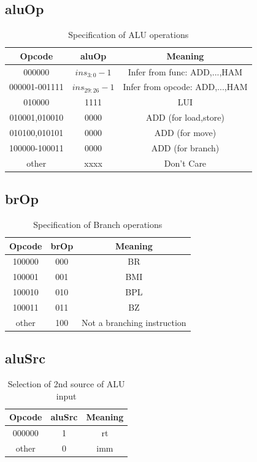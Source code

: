 \documentclass{article}
\begin{document}
\subsection{aluOp}
\begin{table}[H]
    \centering
    \begin{tabular}{|c|c|c|}
        \hline
        \textbf{Opcode} & \textbf{aluOp} & \textbf{Meaning} \\
        \hline
        000000 & $ins_{3:0}-1$ & Infer from func: ADD,...,HAM \\
        000001-001111 & $ins_{29:26}-1$ & Infer from opcode: ADD,...,HAM \\
        010000 & 1111 & LUI \\
        010001,010010 & 0000 & ADD (for load,store)\\
        010100,010101 & 0000 & ADD (for move) \\
        100000-100011 & 0000 & ADD (for branch) \\
        other & xxxx & Don't Care \\
        \hline
    \end{tabular}
    \caption{Specification of ALU operations}
\end{table}

\subsection{brOp}
\begin{table}[H]
    \centering
    \begin{tabular}{|c|c|c|}
        \hline
        \textbf{Opcode} & \textbf{brOp} & \textbf{Meaning} \\
        \hline
        100000 & 000 & BR \\
        100001 & 001 & BMI \\
        100010 & 010 & BPL \\
        100011 & 011 & BZ \\
        other & 100 & Not a branching instruction \\
        \hline
    \end{tabular}
    \caption{Specification of Branch operations}
\end{table}

\subsection{aluSrc}
\begin{table}[H]
    \centering
    \begin{tabular}{|c|c|c|}
        \hline
        \textbf{Opcode} & \textbf{aluSrc} & \textbf{Meaning} \\
        \hline
        000000 & 1 & rt \\
        other & 0 & imm \\
        \hline
    \end{tabular}
    \caption{Selection of 2nd source of ALU input}
\end{table}
\end{document}
